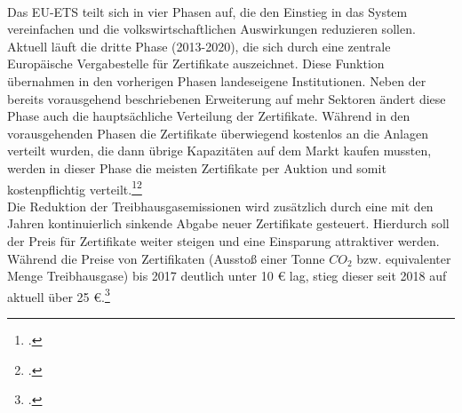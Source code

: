 \\
Das EU-ETS teilt sich in vier Phasen auf, die den Einstieg in das System vereinfachen und die volkswirtschaftlichen Auswirkungen reduzieren sollen. 
Aktuell läuft die dritte Phase (2013-2020), die sich durch eine zentrale Europäische Vergabestelle für Zertifikate auszeichnet. Diese Funktion übernahmen in den vorherigen Phasen landeseigene Institutionen.
Neben der bereits vorausgehend beschriebenen Erweiterung auf mehr Sektoren ändert diese Phase auch die hauptsächliche Verteilung der Zertifikate. Während in den vorausgehenden Phasen die Zertifikate überwiegend kostenlos an die Anlagen verteilt wurden, die dann übrige Kapazitäten auf dem Markt kaufen mussten, werden in dieser Phase die meisten Zertifikate per Auktion und somit kostenpflichtig verteilt.\footcite[Vgl.][]{Komission}\footcite[Vgl.][]{Buchner2007}
\\
Die Reduktion der Treibhausgasemissionen wird zusätzlich durch eine mit den Jahren kontinuierlich sinkende Abgabe neuer Zertifikate gesteuert. Hierdurch soll der Preis für Zertifikate weiter steigen und eine Einsparung attraktiver werden.
Während die Preise von Zertifikaten (Ausstoß einer Tonne $CO_2$ bzw. equivalenter Menge Treibhausgase) bis 2017 deutlich unter 10 € lag, stieg dieser seit 2018 auf aktuell über 25 €.\footcite[Vgl.][]{FinanzenNet}
